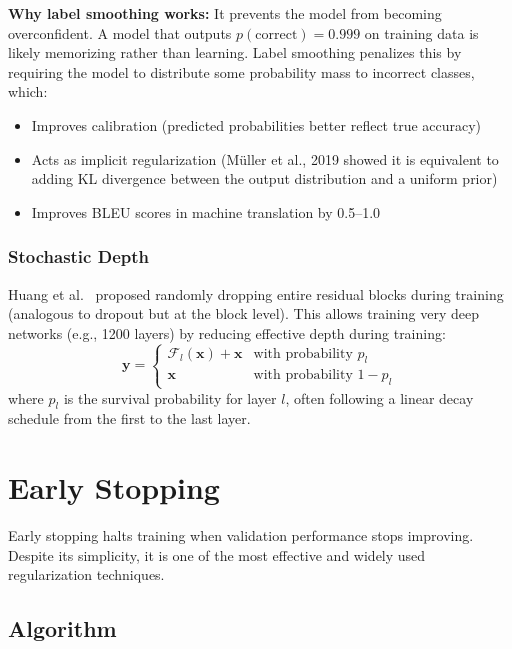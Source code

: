 \textbf{Why label smoothing works:} It prevents the model from becoming overconfident. A model that outputs $p(\text{correct}) = 0.999$ on training data is likely memorizing rather than learning. Label smoothing penalizes this by requiring the model to distribute some probability mass to incorrect classes, which:
\begin{itemize}
    \item Improves calibration (predicted probabilities better reflect true accuracy)
    \item Acts as implicit regularization (M\"uller et al., 2019 showed it is equivalent to adding KL divergence between the output distribution and a uniform prior)
    \item Improves BLEU scores in machine translation by 0.5--1.0
\end{itemize}

\subsubsection{Stochastic Depth}

Huang et al.\ \cite{huang2016deep} proposed randomly dropping entire residual blocks during training (analogous to dropout but at the block level). This allows training very deep networks (e.g., 1200 layers) by reducing effective depth during training:
\begin{equation}
\mathbf{y} = \begin{cases} \mathcal{F}_l(\mathbf{x}) + \mathbf{x} & \text{with probability } p_l \\ \mathbf{x} & \text{with probability } 1 - p_l \end{cases}
\end{equation}
where $p_l$ is the survival probability for layer $l$, often following a linear decay schedule from the first to the last layer.

\section{Early Stopping}

Early stopping halts training when validation performance stops improving. Despite its simplicity, it is one of the most effective and widely used regularization techniques.

\subsection{Algorithm}


